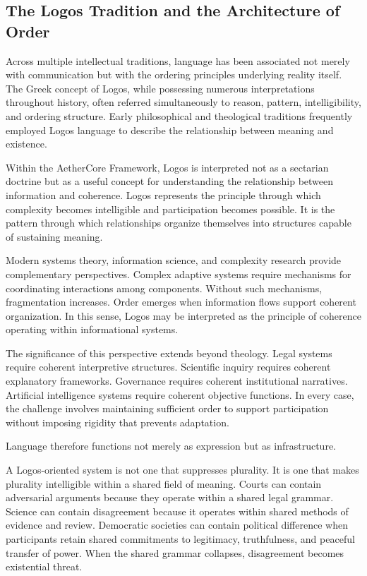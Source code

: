 \documentclass[12pt]{article}
\begin{document}
\subsection{The Logos Tradition and the Architecture of Order}

Across multiple intellectual traditions, language has been associated not merely with communication but with the ordering principles underlying reality itself. The Greek concept of Logos, while possessing numerous interpretations throughout history, often referred simultaneously to reason, pattern, intelligibility, and ordering structure. Early philosophical and theological traditions frequently employed Logos language to describe the relationship between meaning and existence.

Within the AetherCore Framework, Logos is interpreted not as a sectarian doctrine but as a useful concept for understanding the relationship between information and coherence. Logos represents the principle through which complexity becomes intelligible and participation becomes possible. It is the pattern through which relationships organize themselves into structures capable of sustaining meaning.

Modern systems theory, information science, and complexity research provide complementary perspectives. Complex adaptive systems require mechanisms for coordinating interactions among components. Without such mechanisms, fragmentation increases. Order emerges when information flows support coherent organization. In this sense, Logos may be interpreted as the principle of coherence operating within informational systems.

The significance of this perspective extends beyond theology. Legal systems require coherent interpretive structures. Scientific inquiry requires coherent explanatory frameworks. Governance requires coherent institutional narratives. Artificial intelligence systems require coherent objective functions. In every case, the challenge involves maintaining sufficient order to support participation without imposing rigidity that prevents adaptation.

Language therefore functions not merely as expression but as infrastructure.

A Logos-oriented system is not one that suppresses plurality. It is one that makes plurality intelligible within a shared field of meaning. Courts can contain adversarial arguments because they operate within a shared legal grammar. Science can contain disagreement because it operates within shared methods of evidence and review. Democratic societies can contain political difference when participants retain shared commitments to legitimacy, truthfulness, and peaceful transfer of power. When the shared grammar collapses, disagreement becomes existential threat.
\end{document}
